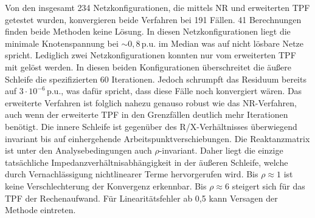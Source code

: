 %

Von den insgesamt 234 Netzkonfigurationen, die mittels NR und erweiterten TPF getestet wurden, konvergieren beide Verfahren bei 191 Fällen.
41 Berechnungen finden beide Methoden keine Lösung. In diesen Netzkonfigurationen liegt die minimale Knotenspannung bei $\sim0,8\,$p.u. im Median was auf nicht lösbare Netze spricht.
Lediglich zwei Netzkonfigurationen konnten nur vom erweiterten TPF mit gelöst werden.
In diesen beiden Konfigurationen überschreitet die äußere Schleife die spezifizierten 60 Iterationen. 
Jedoch schrumpft das Residuum bereits auf $3\cdot10^{-6}\,\text{p.u.}$, was dafür spricht, dass diese Fälle noch konvergiert wären.
Das erweiterte Verfahren ist folglich nahezu genauso robust wie das NR-Verfahren, auch wenn der erweiterte TPF in den Grenzfällen deutlich mehr Iterationen benötigt.
Die innere Schleife ist gegenüber des R/X-Verhältnisses überwiegend invariant bis auf einhergehende Arbeitspunktverschiebungen.
Die Reaktanzmatrix ist unter den Analysebedingungen auch $\rho$-invariant.
Daher liegt die einzige tatsächliche Impedanzverhältnisabhängigkeit in der äußeren Schleife, welche durch Vernachlässigung nichtlinearer Terme hervorgerufen wird. 
Bis $\rho\approx1$ ist keine Verschlechterung der Konvergenz erkennbar.
Bis $\rho\approx6$ steigert sich für das TPF der Rechenaufwand. 
Für Linearitätsfehler ab 0,5 kann Versagen der Methode eintreten.



















